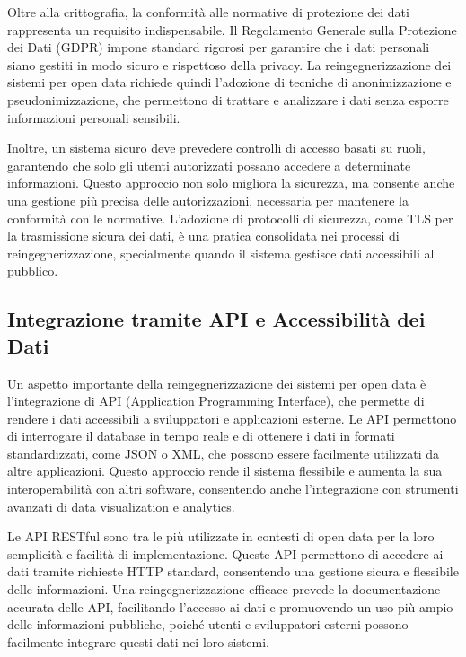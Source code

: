 Oltre alla crittografia, la conformità alle normative di protezione dei dati rappresenta un requisito indispensabile. Il Regolamento Generale sulla Protezione dei Dati (GDPR) impone standard rigorosi per garantire che i dati personali siano gestiti in modo sicuro e rispettoso della privacy. La reingegnerizzazione dei sistemi per open data richiede quindi l’adozione di tecniche di anonimizzazione e pseudonimizzazione, che permettono di trattare e analizzare i dati senza esporre informazioni personali sensibili.

Inoltre, un sistema sicuro deve prevedere controlli di accesso basati su ruoli, garantendo che solo gli utenti autorizzati possano accedere a determinate informazioni. Questo approccio non solo migliora la sicurezza, ma consente anche una gestione più precisa delle autorizzazioni, necessaria per mantenere la conformità con le normative. L'adozione di protocolli di sicurezza, come TLS per la trasmissione sicura dei dati, è una pratica consolidata nei processi di reingegnerizzazione, specialmente quando il sistema gestisce dati accessibili al pubblico.

\subsection{Integrazione tramite API e Accessibilità dei Dati}

Un aspetto importante della reingegnerizzazione dei sistemi per open data è l’integrazione di API (Application Programming Interface), che permette di rendere i dati accessibili a sviluppatori e applicazioni esterne. Le API permettono di interrogare il database in tempo reale e di ottenere i dati in formati standardizzati, come JSON o XML, che possono essere facilmente utilizzati da altre applicazioni. Questo approccio rende il sistema flessibile e aumenta la sua interoperabilità con altri software, consentendo anche l’integrazione con strumenti avanzati di data visualization e analytics.

Le API RESTful sono tra le più utilizzate in contesti di open data per la loro semplicità e facilità di implementazione. Queste API permettono di accedere ai dati tramite richieste HTTP standard, consentendo una gestione sicura e flessibile delle informazioni. Una reingegnerizzazione efficace prevede la documentazione accurata delle API, facilitando l'accesso ai dati e promuovendo un uso più ampio delle informazioni pubbliche, poiché utenti e sviluppatori esterni possono facilmente integrare questi dati nei loro sistemi.

